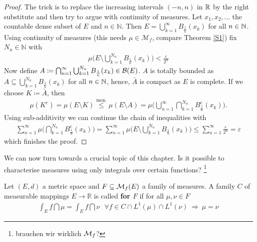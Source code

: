 \begin{proof}[Proof]
	The trick is to replace the increasing intervals $(-n,n)$ in $\mathbb{R}$ by the right substitute and then try to argue with continuity of measures. Let $x_1,x_2,...$ the countable dense subset of $E$ and $n\in\mathbb{N}$. Then $E = \bigcup\limits_{k=1}^{\infty} B_{\frac{1}{n}}(x_k)$ for all $n\in\mathbb{N}$. Using continuity of measures (this needs $\mu\in \mathcal M_f$, compare Theorem \ref{S1}) fix $N_n \in \mathbb{N}$ with 
	\begin{align*}
		\mu \Big( E \text{\textbackslash} \bigcup\limits_{k=1}^{N_n}B_{\frac{1}{n}}(x_k)\Big) < \frac{\varepsilon}{2^n}
	\end{align*}
	Now define $A \coloneqq \bigcap_{n=1}^{\infty} \bigcup_{k=1}^{N_n}B_{\frac{1}{n}}(x_k) \in\mathcal{B}(E)$. $A$ is totally bounded as $A\subseteq \bigcup_{k=1}^{N_n} B_{\frac{1}{n}}(x_k)$ for all $n\in\mathbb{N}$, hence, $\bar{A}$ is compact as $E$ is complete. If we choose $K \coloneqq \bar{A}$, then
	\begin{align*}
		\mu (K^c) = \mu (E \text{\textbackslash} K ) 
				\overset{\text{mon.}}{\leq} \mu (E \text{\textbackslash} A ) 
				= \mu \bigg( \bigcup_{n=1}^{\infty} \bigcap_{k=1}^{N_n}B_{\frac{1}{n}}^c (x_k) \bigg).
	\end{align*}			
	Using sub-additivity we can continue the chain of inequalities with
	\begin{align*}
				\sum\limits_{n=1}^{\infty} \mu \bigg( \bigcap\limits_{k=1}^{N_n} B_{\frac{1}{n}}^c (x_k) \bigg) 
				= \sum\limits_{n=1}^{\infty} \mu \bigg( E \text{\textbackslash} \bigcup\limits_{k=1}^{N_n} B_{\frac{1}{n}}(x_k) \bigg)
				\leq \sum\limits_{n=1}^{\infty}\frac{\varepsilon}{2^n}
				= \varepsilon
	\end{align*}
	which finishes the proof.
\end{proof}
We can now turn towards a crucial topic of this chapter. Is it possible to characterise measures using only integrals over certain functions?
\footnote{brauchen wir wirklich $\mathcal{M}_f$?}
\begin{ldef}
\begin{deff}
	Let $(E,d)$ a metric space and $F \subseteq \mathcal{M}_f(E)$ a family of measures. A family $C$ of measurable mappings $E \to \mathbb{R}$ is called \textbf{ for $F$} if for all $\mu,\nu \in F$
	\begin{align*}
		\int_E f\dint \mu = \int_E f\dint \nu \:\:\: \forall f \in C \cap L^1(\mu)\cap L^1(\nu)\: \Rightarrow \: \mu = \nu
	\end{align*}
\end{deff}
\end{ldef}
